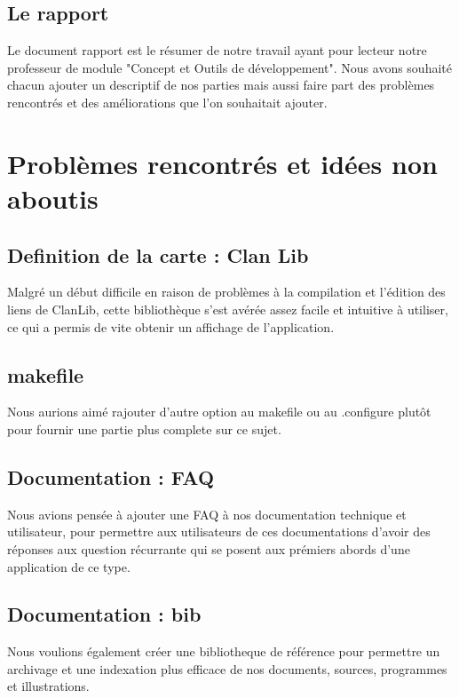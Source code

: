 \documentclass[a4paper 12pts]{article}
\begin{document}
\subsection{Le rapport}

Le document rapport est le résumer de notre travail ayant pour lecteur notre professeur de module "Concept et Outils de développement".
Nous avons souhaité chacun ajouter un descriptif de nos parties mais aussi faire part des problèmes rencontrés et des  améliorations que l'on souhaitait ajouter.

\newpage
\section{Problèmes rencontrés et idées non aboutis}

\subsection{Definition de la carte : Clan Lib}
Malgré un début difficile en raison de problèmes à la compilation et l'édition des liens de ClanLib, cette bibliothèque s'est avérée assez facile et intuitive à utiliser, ce qui a permis de vite obtenir un affichage de l'application.

\subsection{makefile}
Nous aurions aimé rajouter d'autre option au makefile ou au .configure plutôt pour fournir une partie plus complete sur ce sujet.

\subsection{Documentation : FAQ}

Nous avions pensée à ajouter une FAQ à nos documentation technique et utilisateur, pour permettre aux utilisateurs de ces documentations d'avoir des réponses aux question récurrante qui se posent aux prémiers abords d'une application de ce type.

\subsection{Documentation : bib}

Nous voulions également créer une bibliotheque de référence pour permettre un archivage et une indexation plus efficace de nos documents, sources, programmes et illustrations.
\end{document}
